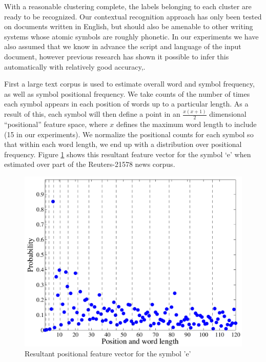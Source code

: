 \documentclass[times, 10pt,twocolumn]{article}
\begin{document}

With a reasonable clustering complete, the labels belonging to each cluster are
ready to be recognized.  Our contextual recognition approach has only been
tested on documents written in English, but should also be amenable to other
writing systems whose atomic symbols are roughly phonetic.  In our experiments
we have also assumed that we know in advance the script and language of the
input document, however previous research has shown it possible to infer this
automatically with relatively good accuracy\cite{sibun1994},\cite{hochberg1997}.

First a large text corpus is used to estimate overall word and symbol frequency,
as well as symbol positional frequency.  We take counts of the number of times
each symbol appears in each position of words up to a particular length.  As
a result of this, each symbol will then define a point in an $\frac{x
(x+1)}{2}$ dimensional ``positional'' feature space, where $x$ defines the
maximum word length to include (15 in our experiments).  We normalize the
positional counts for each symbol so that within each word length, we end up
with a distribution over positional frequency.  Figure \ref{e_pos_fig} shows
this resultant feature vector for the symbol `e' when estimated over part of
the Reuters-21578 news corpus\cite{lewis2004}.

\begin{figure}[ht]
  \centering
  \includegraphics[scale=.4]{figures/e_pos_feature}
  \caption{Resultant positional feature vector for the symbol 'e'}
  \label{e_pos_fig}
\end{figure}
\end{document}
